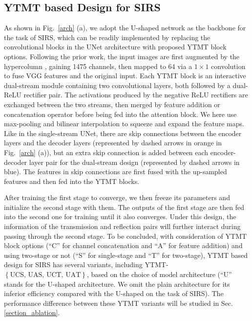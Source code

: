 \documentclass{article}
\begin{document}
\subsection{YTMT based Design for SIRS}
\label{sec:sirs_design}

As shown in Fig.~\ref{arch} (a), we adopt the U-shaped network as the backbone for the task of SIRS, which can be readily implemented by replacing the convolutional blocks in the UNet architecture with proposed YTMT block options.  Following the prior work, the input images are first augmented by the hypercolumn \cite{DBLP:conf/cvpr/ZhangNC18a}, gaining 1475 channels, then mapped to 64 via a $1 \times 1$ convolution to fuse VGG features and the original input. Each YTMT block is an interactive dual-stream module containing two convolutional layers, both followed by a dual-ReLU rectifier pair. The activations produced by the negative ReLU rectifiers are exchanged between the two streams, then merged by feature addition or concatenation operator before being fed into the attention block. We here use max-pooling and bilinear interpolation to squeeze and expand the feature maps.  Like in the single-stream UNet, there are skip connections between the encoder layers and the decoder layers (represented by dashed arrows in orange in Fig.~\ref{arch} (a)), but an extra skip connection is added between each encoder-decoder layer pair for the dual-stream design (represented by dashed arrows in blue). The features in skip connections are first fused with the up-sampled features and then fed into the YTMT blocks.

After training the first stage to converge, we then freeze its parameters and initialize the second stage with them. The outputs of the first stage are then fed into the second one for training until it also converges. Under this design, the information of the transmission and reflection pairs will further interact during passing through the second stage. To be concluded, with consideration of YTMT block options (``C'' for channel concatenation and ``A'' for feature addition) and using two-stage or not (``S'' for single-stage and ``T'' for two-stage), YTMT based design for SIRS has several variants, including YTMT-$\left\{ \textrm{UCS, UAS, UCT, UAT} \right\}$, based on the choice of model architecture (``U'' stands for the U-shaped architecture. We omit the plain architecture for its inferior efficiency compared with the U-shaped on the task of SIRS). The performance difference between these YTMT variants will be studied in Sec. \ref{section_ablation}.
\end{document}
